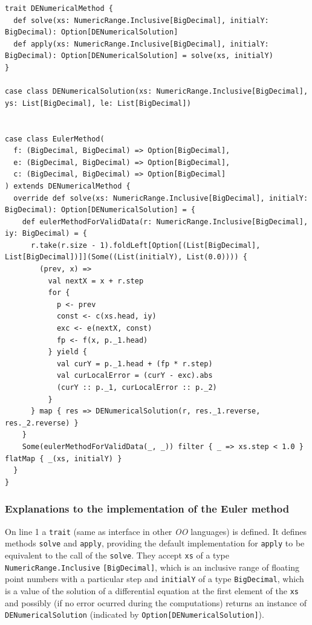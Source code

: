\documentclass[12pt,a4paper,titlepage]{article}
\begin{document}
\begin{lstlisting}[style=scala]
trait DENumericalMethod {
  def solve(xs: NumericRange.Inclusive[BigDecimal], initialY: BigDecimal): Option[DENumericalSolution]
  def apply(xs: NumericRange.Inclusive[BigDecimal], initialY: BigDecimal): Option[DENumericalSolution] = solve(xs, initialY)
}

case class DENumericalSolution(xs: NumericRange.Inclusive[BigDecimal], ys: List[BigDecimal], le: List[BigDecimal])


case class EulerMethod(
  f: (BigDecimal, BigDecimal) => Option[BigDecimal],
  e: (BigDecimal, BigDecimal) => Option[BigDecimal],
  c: (BigDecimal, BigDecimal) => Option[BigDecimal]
) extends DENumericalMethod {
  override def solve(xs: NumericRange.Inclusive[BigDecimal], initialY: BigDecimal): Option[DENumericalSolution] = {
    def eulerMethodForValidData(r: NumericRange.Inclusive[BigDecimal], iy: BigDecimal) = {
      r.take(r.size - 1).foldLeft[Option[(List[BigDecimal], List[BigDecimal])]](Some((List(initialY), List(0.0)))) {
        (prev, x) =>
          val nextX = x + r.step
          for {
            p <- prev
            const <- c(xs.head, iy)
            exc <- e(nextX, const)
            fp <- f(x, p._1.head)
          } yield {
            val curY = p._1.head + (fp * r.step)
            val curLocalError = (curY - exc).abs
            (curY :: p._1, curLocalError :: p._2)
          }
      } map { res => DENumericalSolution(r, res._1.reverse, res._2.reverse) }
    }
    Some(eulerMethodForValidData(_, _)) filter { _ => xs.step < 1.0 } flatMap { _(xs, initialY) }
  }
}
\end{lstlisting}

  \subsubsection{Explanations to the implementation of the Euler method}

  \newcommand{\code}[1]{\lstinline[style=scala]{#1}}

  On line 1 a \code{trait} (same as interface in other \textit{OO} languages) is defined. It defines methods \code{solve} and \code{apply}, providing the default implementation for \code{apply} to be equivalent to the call of the \code{solve}. They accept \code{xs} of a type \code{NumericRange.Inclusive} \code{[BigDecimal]}, which is an inclusive range of floating point numbers with a particular step and \code{initialY} of a type \code{BigDecimal}, which is a value of the solution of a differential equation at the first element of the \code{xs} and possibly (if no error ocurred during the computations) returns an instance of \code{DENumericalSolution} (indicated by \code{Option[DENumericalSolution]}).
\end{document}
